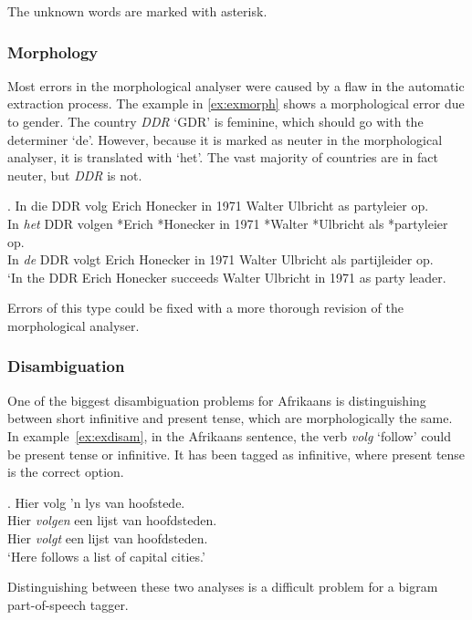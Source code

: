 \documentclass[11pt]{article}
\begin{document}
The unknown words are marked with asterisk.

\subsubsection{Morphology}

Most errors in the morphological analyser were caused by a flaw in the automatic extraction process.
The example in \ref{ex:exmorph} shows a morphological error due to gender. The 
country \emph{DDR} `GDR' is feminine, which should go with the determiner `de'. However, because 
it is marked as neuter in the morphological analyser, it is translated with `het'. The vast 
majority of countries are in fact neuter, but \emph{DDR} is not. 

\ex. \label{ex:exmorph}
    In die DDR volg Erich Honecker in 1971 Walter Ulbricht as partyleier op. \\
    In {\em het} DDR volgen *Erich *Honecker in 1971 *Walter *Ulbricht als *partyleier op. \\
    In {\em de} DDR volgt Erich Honecker in 1971 Walter Ulbricht als partijleider op. \\
    `In the DDR Erich Honecker succeeds Walter Ulbricht in 1971 as party leader.

Errors of this type could be fixed with a more thorough revision of the morphological
analyser.

\subsubsection{Disambiguation}

One of the biggest disambiguation problems for Afrikaans is distinguishing between short infinitive and present 
tense, which are morphologically the same. In example~\ref{ex:exdisam}, in the Afrikaans sentence, the verb 
{\em volg} `follow' could be present tense or infinitive. It has been tagged as infinitive, where present tense 
is the correct option.

\ex. \label{ex:exdisam} 
    Hier volg 'n lys van hoofstede. \\
    Hier {\em volgen} een lijst van hoofdsteden. \\
    Hier {\em volgt} een lijst van hoofdsteden.  \\
   `Here follows a list of capital cities.'

Distinguishing between these two analyses is a difficult problem for a bigram part-of-speech tagger.
\end{document}
